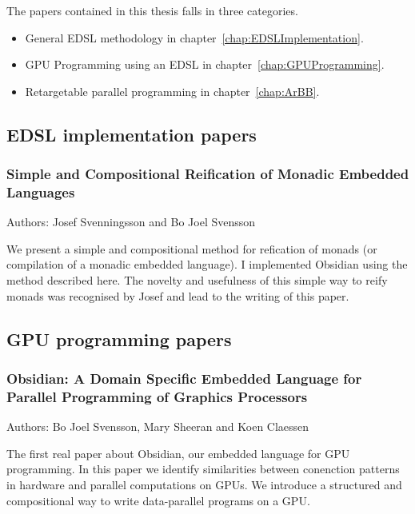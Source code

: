 \documentclass[a4paper]{book}
\newcommand{\paperBB}{Simple and Compositional Reification of Monadic Embedded Languages}
\newcommand{\paperIFL}{Obsidian: A Domain Specific Embedded Language for Parallel Programming of Graphics Processors}
\begin{document}
The papers contained in this thesis falls in three categories. 
\begin{itemize} 
\item General EDSL methodology in chapter~\ref{chap:EDSLImplementation}. 
\item GPU Programming using an EDSL in chapter~\ref{chap:GPUProgramming}. 
\item Retargetable parallel programming in chapter~\ref{chap:ArBB}. 
\end{itemize} 

\subsection*{EDSL implementation papers} 

\subsubsection*{\paperBB} 

Authors: Josef Svenningsson and Bo Joel Svensson 

\vspace{5mm}

\noindent We present a simple and compositional method for refication 
of monads (or compilation of a monadic embedded language). I implemented 
Obsidian using the method described here. The novelty and 
usefulness of this simple way to reify monads was recognised by Josef
and lead to the writing of this paper.  

\subsection*{GPU programming papers} 

\subsubsection{\paperIFL}

Authors: Bo Joel Svensson, Mary Sheeran and Koen Claessen \newline

\vspace{5mm}

The first real paper about Obsidian, our embedded language for GPU 
programming. In this paper we identify similarities between 
conenction patterns in hardware and parallel computations on GPUs. 
We introduce a structured and compositional way to write data-parallel 
programs on a GPU.
\end{document}
